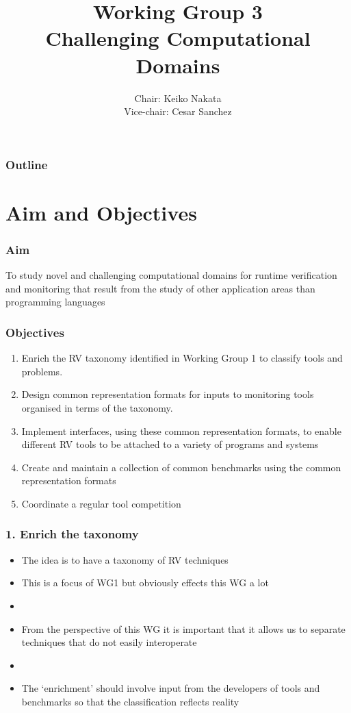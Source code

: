 \documentclass{beamer}
\title[WG3]{Working Group 3\\
{\bf Challenging Computational Domains}}
\author{Chair: Keiko Nakata\\ Vice-chair: Cesar Sanchez}
\begin{document}
\begin{frame}
  \titlepage
\end{frame}

\begin{frame}
  \frametitle{Outline}
  \tableofcontents  
\end{frame}

\section{Aim and Objectives}

\begin{frame}
\frametitle{Aim}
\Large


To study novel and challenging computational domains for runtime
verification and monitoring that result from the study of other
application areas than programming languages
\end{frame}

\begin{frame}
\frametitle{Objectives}
\begin{enumerate}
\item Enrich the RV taxonomy identified in Working Group 1 to classify
  tools and problems.
\item Design common representation formats for inputs to monitoring
  tools organised in terms of the taxonomy.
\item Implement interfaces, using these common representation formats,
  to enable different RV tools to be attached to a variety of programs
  and systems
\item Create and maintain a collection of common benchmarks using the
  common representation formats
\item Coordinate a regular tool competition
\end{enumerate}
\end{frame}

\begin{frame}
\frametitle{1. Enrich the taxonomy}
\begin{itemize}
\item The idea is to have a taxonomy of RV techniques
\item This is a focus of WG1 but obviously effects this WG a lot
\item[]
\item From the perspective of this WG it is important that it allows
  us to separate techniques that do not easily interoperate
\item[]
\item The `enrichment' should involve input from the developers of
  tools and benchmarks so that the classification reflects reality
\end{itemize}
\end{frame}
\end{document}
